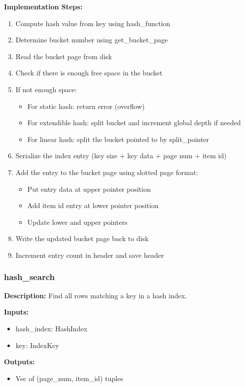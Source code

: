 \documentclass[11pt,a4paper]{article}
\begin{document}
\textbf{Implementation Steps:}
\begin{enumerate}
\item Compute hash value from key using hash\_function
\item Determine bucket number using get\_bucket\_page
\item Read the bucket page from disk
\item Check if there is enough free space in the bucket
\item If not enough space:
    \begin{itemize}
    \item For static hash: return error (overflow)
    \item For extendible hash: split bucket and increment global depth if needed
    \item For linear hash: split the bucket pointed to by split\_pointer
    \end{itemize}
\item Serialize the index entry (key size + key data + page num + item id)
\item Add the entry to the bucket page using slotted page format:
    \begin{itemize}
    \item Put entry data at upper pointer position
    \item Add item id entry at lower pointer position
    \item Update lower and upper pointers
    \end{itemize}
\item Write the updated bucket page back to disk
\item Increment entry count in header and save header
\end{enumerate}

\subsubsection{hash\_search}

\textbf{Description:} Find all rows matching a key in a hash index.

\textbf{Inputs:}
\begin{itemize}
\item hash\_index: HashIndex
\item key: IndexKey
\end{itemize}

\textbf{Outputs:}
\begin{itemize}
\item Vec of (page\_num, item\_id) tuples
\end{itemize}
\end{document}
